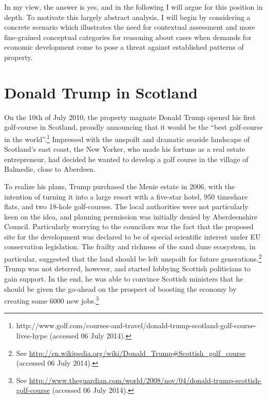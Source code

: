 In my view, the answer is yes, and in the following I will argue for this position in depth. To motivate this largely abstract analysis, I will begin by considering a concrete scenario which illustrates the need for contextual assessment and more fine-grained conceptual categories for reasoning about cases when demands for economic development come to pose a threat against established patterns of property.

\section{Donald Trump in Scotland}\label{sec:dts}

On the 10th of July 2010, the property magnate Donald Trump opened his first golf-course in Scotland, proudly announcing that it would be the ``best golf-course in the world''.\footnote{http://www.golf.com/courses-and-travel/donald-trump-scotland-golf-course-lives-hype (accessed 06 July 2014).} Impressed with the unspoilt and dramatic seaside landscape of Scotland's east coast, the New Yorker, who made his fortune as a real estate entrepreneur, had decided he wanted to develop a golf course in the village of Balmedie, close to Aberdeen.

To realize his plans, Trump purchased the Menie estate in 2006, with the intention of turning it into a large resort with a five-star hotel, 950 timeshare flats, and two 18-hole golf-courses. The local authorities were not particularly keen on the idea, and planning permission was initially denied by Aberdeenshire Council. Particularly worrying to the councilors was the fact that the proposed site for the development was declared to be of special scientific interest under EU conservation legislation. The frailty and richness of the sand dune ecosystem, in particular, suggested that the land should be left unspoilt for future generations.\footnote{See \url{http://en.wikipedia.org/wiki/Donald_Trump#Scottish_golf_course} (accessed 06 July 2014).} Trump was not deterred, however, and started lobbying Scottish politicians to gain support. In the end, he was able to convince Scottish ministers that he should be given the go-ahead on the prospect of boosting the economy by creating some 6000 new jobs.\footnote{See \url{http://www.theguardian.com/world/2008/nov/04/donald-trump-scottish-golf-course} (accessed 06 July 2014).}

